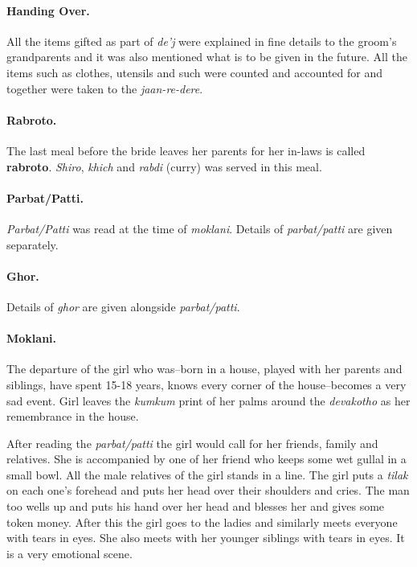 \paragraph{Handing Over.} All the items gifted as part of \textit{de'j} were
explained in fine details to the groom's grandparents and it was also mentioned
what is to be given in the future. All the items such as clothes, utensils and
such were counted and accounted for and together were taken to the
\textit{jaan-re-dere}. 

\paragraph{Rabroto.} The last meal before the bride leaves her parents for her
in-laws is called \textbf{rabroto}. \textit{Shiro}, \textit{khich} and
\textit{rabdi} (curry) was served in this meal.

\paragraph{Parbat/Patti.} \textit{Parbat/Patti} was read at the time of
\textit{moklani}. Details of \textit{parbat/patti} are given separately.

\paragraph{Ghor.} Details of \textit{ghor} are given alongside
\textit{parbat/patti}.

\paragraph{Moklani.} The departure of the girl who was--born in a house, played
with her parents and siblings, have spent 15-18 years, knows every corner of
the house--becomes a very sad event. Girl leaves the \textit{kumkum} print of
her palms around the \textit{devakotho} as her remembrance in the house. 

After reading the \textit{parbat/patti} the girl would call for her friends,
family and relatives. She is accompanied by one of her friend who keeps
some wet gullal in a small bowl. All the male relatives of the girl
stands in a line. The girl puts a \textit{tilak} on each one's forehead
and puts her head over their shoulders and cries. The man too wells up
and puts his hand over her head and blesses her and gives some token
money. After this the girl goes to the ladies and similarly meets
everyone with tears in eyes. She also meets with her younger siblings
with tears in eyes. It is a very emotional scene.

